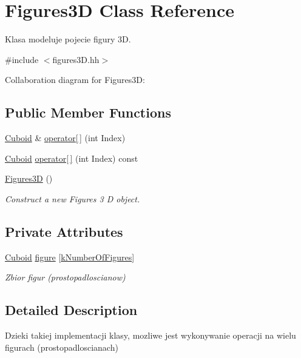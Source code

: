 \hypertarget{class_figures3_d}{}\section{Figures3D Class Reference}
\label{class_figures3_d}


Klasa modeluje pojecie figury 3D.  




{\ttfamily \#include $<$figures3\+D.\+hh$>$}



Collaboration diagram for Figures3D\+:
\subsection*{Public Member Functions}
\begin{DoxyCompactItemize}
\item 
\hyperlink{class_cuboid}{Cuboid} \& \hyperlink{class_figures3_d_ab8147ad930fa98f3801a0dbc5cffaa42}{operator\mbox{[}$\,$\mbox{]}} (int Index)
\item 
\hyperlink{class_cuboid}{Cuboid} \hyperlink{class_figures3_d_afb1114933395213e445ce1e9745ee803}{operator\mbox{[}$\,$\mbox{]}} (int Index) const 
\item 
\hyperlink{class_figures3_d_af69acc0b91c012e02571decfe404f72a}{Figures3D} ()
\begin{DoxyCompactList}\small\item\em Construct a new Figures 3 D object. \end{DoxyCompactList}\end{DoxyCompactItemize}
\subsection*{Private Attributes}
\begin{DoxyCompactItemize}
\item 
\hyperlink{class_cuboid}{Cuboid} \hyperlink{class_figures3_d_a76d206fdb62bc6c64b4b1d4a6ce1d458}{figure} \mbox{[}\hyperlink{figures3_d_8hh_a4b3b868ccdf10e9fe97c317eb63f5782}{k\+Number\+Of\+Figures}\mbox{]}
\begin{DoxyCompactList}\small\item\em Zbior figur (prostopadloscianow) \end{DoxyCompactList}\end{DoxyCompactItemize}


\subsection{Detailed Description}
Dzieki takiej implementacji klasy, mozliwe jest wykonywanie operacji na wielu figurach (prostopadloscianach) 

